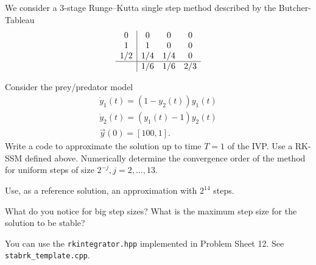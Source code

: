 \begin{problem} \label{prb:stabRK3} 

We consider a 3-stage Runge--Kutta single step method described by the Butcher-Tableau
\begin{align} \label{eq:rkesv}
\begin{array}{c|ccc}
    0   & 0   & 0   & 0   \\
    1   & 1   & 0   & 0   \\
    1/2 & 1/4 & 1/4 & 0   \\\hline
    & 1/6 & 1/6 & 2/3 \\
\end{array}
\end{align}

% 
% 
% 
% 

\begin{subproblem}[1]
Consider the prey/predator model
\begin{align} \label{eq:predator-prey}
 \dot y_1(t) = (1 - y_2(t)) y_1(t) \\
 \dot y_2(t) = (y_1(t) - 1) y_2(t) \\
 \vec{y}(0) = \left[ 100, 1 \right].
\end{align}
Write a \Cpp{} code to approximate the solution up to time $T = 1$ of the IVP. Use a RK-SSM defined above. Numerically determine the convergence order of the method for uniform steps of size $2^{-j}, j = 2,\dots,13$.
	
Use, as a reference solution, an approximation with $2^{14}$ steps.

What do you notice for big step sizes? What is the maximum step size for the solution to be stable?
	
\begin{hint}
  You can use the \verb|rkintegrator.hpp| implemented in Problem Sheet 12. See \verb|stabrk_template.cpp|.
\end{hint}
%   


\end{subproblem}
\end{problem}
